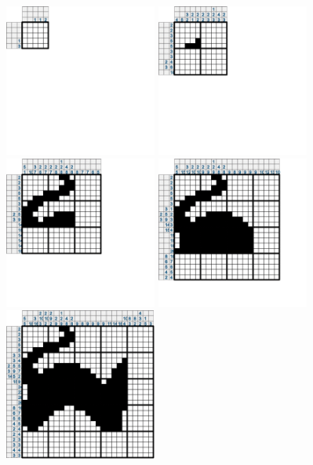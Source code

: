 \documentclass{report}
\begin{document}
		\begin{figure}[H]
	       	 	\includegraphics[width=5cm]{../Images/cat/cat1.png}
			\hspace{1cm}
          		\includegraphics[width=5cm]{../Images/cat/cat2.png}
			\hspace{1cm}
			\includegraphics[width=5cm]{../Images/cat/cat3.png}
			\hspace{1cm}
          		\includegraphics[width=5cm]{../Images/cat/cat4.png}
			\hspace{1cm}
          		\includegraphics[width=5cm]{../Images/cat/cat5.png}

\end{figure}
\end{document}
